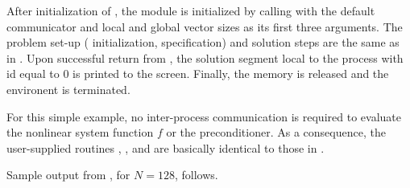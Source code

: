 After initialization of {\mpi}, the {\nvecp} module is initialized by calling
 with the default {\mpi} communicator  and
local and global vector sizes as its first three arguments.
The problem set-up ({\kinsol} initialization, {\kinspgmr} specification) and
solution steps are the same as in . 
Upon successful return from , the solution segment local to 
the process with id equal to $0$ is printed to the screen.
Finally, the {\kinsol} memory is released and the {\mpi} environent is
terminated. 

For this simple example, no inter-process communication is required to
evaluate the nonlinear system function $f$ or the preconditioner. 
As a consequence, the user-supplied routines , , and
 are basically identical to those in .

Sample output from , for $N=128$, follows.

